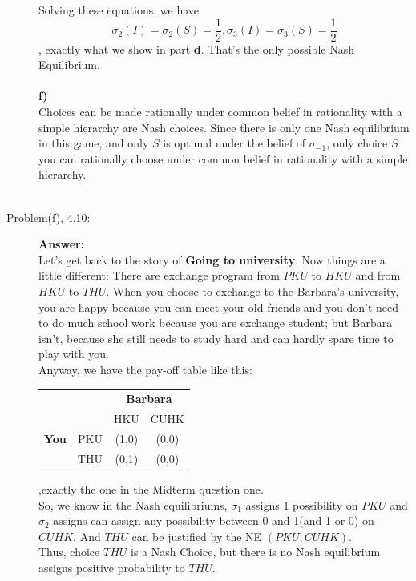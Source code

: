 \documentclass{article}
\begin{document}
\begin{description}
    Solving these equations, we have $$\sigma _2(I)=\sigma _2(S)=\frac{1}{2}, \sigma _3(I)=\sigma _3(S)=\frac{1}{2}$$
    , exactly what we show in part {\bf d}. That's the only possible Nash Equilibrium.\\\\
    {\bf f)}\\
    Choices can be made rationally under common belief in rationality with a simple hierarchy are Nash choices. Since there is only one Nash equilibrium in this game, and only $S$ is optimal under the belief of $\sigma _{-1}$, only choice $S$ you can rationally choose under common belief in rationality with a simple hierarchy.\\\\
    \item[Problem(f), 4.10:]{\bf Answer:}\\
    Let's get back to the story of {\bf Going to university}. Now things are a little different: There are exchange program from $PKU$ to $HKU$ and from $HKU$ to $THU$. When you choose to exchange to the Barbara's university, you are happy because you can meet your old friends and you don't need to do much school work because you are exchange student; but Barbara isn't, because she still needs to study hard and can hardly spare time to play with you.\\ 
    Anyway, we have the pay-off table like this:
  
    \begin{center}
\begin{tabular}{rrcc}

           &            & \multicolumn{ 2}{c}{{\bf Barbara}} \\

           &            &        HKU &       CUHK \\

\multicolumn{ 1}{c}{{\bf You}} &        PKU &      (1,0) &      (0,0) \\

\multicolumn{ 1}{c}{{\bf }} &        THU &      (0,1) &      (0,0) \\

\end{tabular}
\end{center}
,exactly the one in the Midterm question one. \\
  So, we know in the Nash equilibriums, $\sigma_1$ assigns 1 possibility on $PKU$ and $\sigma_2$ assigns can assign any possibility between 0 and 1(and 1 or 0) on $CUHK$. And $THU$ can be justified by the NE $(PKU,CUHK)$.\\
  Thus, choice $THU$ is a Nash Choice, but there is no Nash equilibrium assigns positive probability to $THU$.
\end{description}
\end{document}
